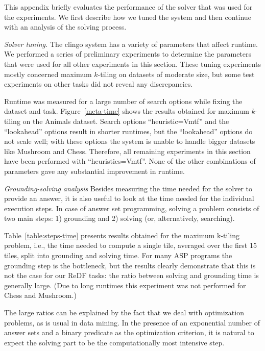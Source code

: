 This appendix briefly evaluates the performance of the solver that was used for the experiments. We first describe how we tuned the system and then continue with an analysis of the solving process.

\textit{Solver tuning.} The clingo system \parencite{gebser2011potassco} has a variety of parameters that affect runtime. We performed a series of preliminary experiments to determine the parameters that were used for all other experiments in this section. These tuning experiments mostly concerned maximum $k$-tiling on datasets of moderate size, but some test experiments on other tasks did not reveal any discrepancies. 

Runtime was measured for a large number of search options while fixing the dataset and task. Figure~\ref{meta-time} shows the results obtained for maximum $k$-tiling on the Animals dataset. 
Search options ``heuristic=Vmtf'' and the ``lookahead'' options result in shorter runtimes, but the ``lookahead'' options do not scale well; with these options the system is unable to handle bigger datasets like Mushroom and Chess. Therefore, all remaining experiments in this section have been performed with ``heuristics=Vmtf''. None of the other combinations of parameters gave any substantial improvement in runtime.

\textit{Grounding-solving analysis} Besides measuring the time needed for the solver to provide an answer, it is also useful to look at the time needed for the individual execution steps. In case of answer set programming, solving a problem consists of two main steps: 1) grounding and 2) solving (or, alternatively, searching). 

Table~\ref{table:steps-time} presents results obtained for the maximum k-tiling problem, i.e., the time needed to compute a single tile, averaged over the first 15 tiles, split into grounding and solving time. For many ASP programs the grounding step is the bottleneck, but the results clearly demonstrate that this is not the case for our ReDF tasks: the ratio between solving and grounding time is generally large. (Due to long runtimes this experiment was not performed for Chess and Mushroom.)

The large ratios can be explained by the fact that we deal with optimization problems, as is usual in data mining. In the presence of an exponential number of answer sets and a binary predicate as the optimization criterion, it is natural to expect the solving part to be the computationally most intensive step. 

